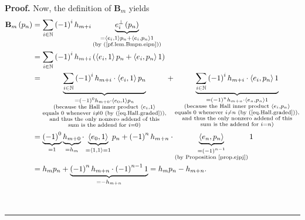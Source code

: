\documentclass[numbers=enddot,12pt,final,onecolumn,notitlepage]{scrartcl}%
\theoremstyle{definition}
\newenvironment{proof}[1][Proof]{\noindent\textbf{#1.} }{\ \rule{0.5em}{0.5em}}
\let\sumnonlimits\sum
\renewcommand{\sum}{\sumnonlimits\limits}
\begin{document}
\begin{proof}
Now, the definition of $\mathbf{B}_{m}$ yields%
\begin{align*}
\mathbf{B}_{m}\left(  p_{n}\right)   &  =\sum_{i\in\mathbb{N}}\left(
-1\right)  ^{i}h_{m+i}\underbrace{e_{i}^{\perp}\left(  p_{n}\right)
}_{\substack{=\left\langle e_{i},1\right\rangle p_{n}+\left\langle e_{i}%
,p_{n}\right\rangle 1\\\text{(by (\ref{pf.lem.Bmpn.eipn}))}}}\\
&  =\sum_{i\in\mathbb{N}}\left(  -1\right)  ^{i}h_{m+i}\left(  \left\langle
e_{i},1\right\rangle p_{n}+\left\langle e_{i},p_{n}\right\rangle 1\right) \\
&  =\underbrace{\sum_{i\in\mathbb{N}}\left(  -1\right)  ^{i}h_{m+i}%
\cdot\left\langle e_{i},1\right\rangle p_{n}}_{\substack{=\left(  -1\right)
^{0}h_{m+0}\cdot\left\langle e_{0},1\right\rangle p_{n}\\\text{(because the
Hall inner product }\left\langle e_{i},1\right\rangle \\\text{equals }0\text{
whenever }i\neq0\text{ (by (\ref{eq.Hall.graded})),}\\\text{and thus the only
nonzero addend of this}\\\text{sum is the addend for }i=0\text{)}%
}}+\underbrace{\sum_{i\in\mathbb{N}}\left(  -1\right)  ^{i}h_{m+i}%
\cdot\left\langle e_{i},p_{n}\right\rangle 1}_{\substack{=\left(  -1\right)
^{n}h_{m+n}\cdot\left\langle e_{n},p_{n}\right\rangle 1\\\text{(because the
Hall inner product }\left\langle e_{i},p_{n}\right\rangle \\\text{equals
}0\text{ whenever }i\neq n\text{ (by (\ref{eq.Hall.graded})),}\\\text{and thus
the only nonzero addend of this}\\\text{sum is the addend for }i=n\text{)}}}\\
&  =\underbrace{\left(  -1\right)  ^{0}}_{=1}\underbrace{h_{m+0}}_{=h_{m}%
}\cdot\underbrace{\left\langle e_{0},1\right\rangle }_{=\left\langle
1,1\right\rangle =1}p_{n}+\left(  -1\right)  ^{n}h_{m+n}\cdot
\underbrace{\left\langle e_{n},p_{n}\right\rangle }_{\substack{=\left(
-1\right)  ^{n-1}\\\text{(by Proposition \ref{prop.ejpj})}}}1\\
&  =h_{m}p_{n}+\underbrace{\left(  -1\right)  ^{n}h_{m+n}\cdot\left(
-1\right)  ^{n-1}1}_{=-h_{m+n}}=h_{m}p_{n}-h_{m+n}.
\end{align*}

\end{proof}
\end{document}
